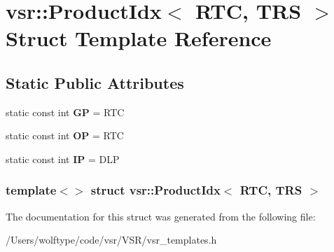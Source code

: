 \hypertarget{structvsr_1_1_product_idx_3_01_r_t_c_00_01_t_r_s_01_4}{\section{vsr\-:\-:Product\-Idx$<$ R\-T\-C, T\-R\-S $>$ Struct Template Reference}
\label{structvsr_1_1_product_idx_3_01_r_t_c_00_01_t_r_s_01_4}
}
\subsection*{Static Public Attributes}
\begin{DoxyCompactItemize}
\item 
\hypertarget{structvsr_1_1_product_idx_3_01_r_t_c_00_01_t_r_s_01_4_ad36214f7c23bc73cc82babc9d2dca514}{static const int {\bfseries G\-P} = R\-T\-C}\label{structvsr_1_1_product_idx_3_01_r_t_c_00_01_t_r_s_01_4_ad36214f7c23bc73cc82babc9d2dca514}

\item 
\hypertarget{structvsr_1_1_product_idx_3_01_r_t_c_00_01_t_r_s_01_4_a6e0b9fb4218d75499c81bc4a3637d4b0}{static const int {\bfseries O\-P} = R\-T\-C}\label{structvsr_1_1_product_idx_3_01_r_t_c_00_01_t_r_s_01_4_a6e0b9fb4218d75499c81bc4a3637d4b0}

\item 
\hypertarget{structvsr_1_1_product_idx_3_01_r_t_c_00_01_t_r_s_01_4_a771ec271ff98e22b9ed99857c42fb0e9}{static const int {\bfseries I\-P} = D\-L\-P}\label{structvsr_1_1_product_idx_3_01_r_t_c_00_01_t_r_s_01_4_a771ec271ff98e22b9ed99857c42fb0e9}

\end{DoxyCompactItemize}
\subsubsection*{template$<$$>$ struct vsr\-::\-Product\-Idx$<$ R\-T\-C, T\-R\-S $>$}



The documentation for this struct was generated from the following file\-:\begin{DoxyCompactItemize}
\item 
/\-Users/wolftype/code/vsr/\-V\-S\-R/vsr\-\_\-templates.\-h\end{DoxyCompactItemize}
